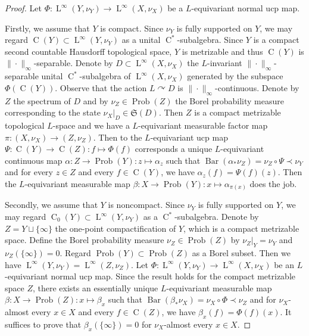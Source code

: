 \documentclass[11pt]{amsart}
\numberwithin{equation}{section}
\theoremstyle{plain}
\theoremstyle{definition}
\newcommand{\Prob}{\operatorname{Prob}}
\newcommand{\bary}{\operatorname{Bar}}
\newcommand{\rC}{\operatorname{C}}
\newcommand{\rL}{\operatorname{ L}}
\begin{document}
\begin{proof} Let $\Phi : \rL^\infty(Y, \nu_Y) \to \rL^\infty(X, \nu_X)$ be a $L$-equivariant normal ucp map.

Firstly, we assume that $Y$ is compact. Since $\nu_Y$ is fully supported on $Y$, we may regard $\rC(Y) \subset \rL^\infty(Y, \nu_Y)$ as a unital $\rC^*$-subalgebra. Since $Y$ is a compact second countable Hausdorff topological space, $Y$ is metrizable and thus $\rC(Y)$ is $\|\cdot\|_\infty$-separable. Denote by $D \subset \rL^\infty(X, \nu_X)$ the $L$-invariant $\|\cdot\|_\infty$-separable unital $\rC^*$-subalgebra of $\rL^\infty(X, \nu_X)$ generated by the subspace $\Phi(\rC(Y))$. Observe that the action $L \curvearrowright D$ is $\|\cdot\|_\infty$-continuous. Denote by $Z$ the spectrum of $D$ and by $\nu_Z \in \Prob(Z)$ the Borel probability measure corresponding to the state $\nu_X|_{D} \in \mathfrak S(D)$. Then $Z$ is a compact metrizable topological $L$-space and we have  a $L$-equivariant measurable factor map $\pi : (X, \nu_X) \to (Z, \nu_Z)$. Then to the $L$-equivariant ucp map $\Psi : \rC(Y) \to \rC(Z) : f \mapsto \Phi(f)$ corresponds a unique $L$-equivariant continuous map $\alpha : Z \to \Prob(Y) : z \mapsto \alpha_z$ such that $\bary(\alpha_\ast \nu_Z) = \nu_Z \circ \Psi \prec \nu_Y$ and for every $z \in Z$ and every $f \in \rC(Y)$, we have $\alpha_z(f) = \Psi(f)(z)$. Then the $L$-equivariant measurable map $\beta : X \to \Prob(Y) : x \mapsto \alpha_{\pi(x)}$ does the job.

Secondly, we assume that $Y$ is noncompact. Since $\nu_Y$ is fully supported on $Y$, we may regard $\rC_0(Y) \subset \rL^\infty(Y, \nu_Y)$ as a $\rC^*$-subalgebra. Denote by $Z = Y \sqcup \{\infty\}$ the one-point compactification of $Y$, which is a compact metrizable space. Define the Borel probability measure $\nu_Z \in \Prob(Z)$ by $\nu_Z|_Y = \nu_Y$ and $\nu_Z(\{\infty\}) = 0$. Regard $\Prob(Y) \subset \Prob(Z)$ as a Borel subset. Then we have $\rL^\infty(Y, \nu_Y) = \rL^\infty(Z, \nu_Z)$. Let $\Phi : \rL^\infty(Y, \nu_Y) \to \rL^\infty(X, \nu_X)$ be an $L$-equivariant normal ucp map. Since the result holds for the compact metrizable space $Z$, there exists an essentially unique $L$-equivariant measurable map $\beta : X \to \Prob(Z) : x \mapsto \beta_x$ such that $\bary(\beta_\ast \nu_X) = \nu_X \circ \Phi \prec \nu_Z$ and for $\nu_X$-almost every $x \in X$ and every $f \in \rC(Z)$, we have $\beta_x(f) = \Phi(f)(x)$. It suffices to prove that $\beta_x(\{\infty\}) = 0$ for $\nu_X$-almost every $x \in X$.


\end{proof}
\end{document}
